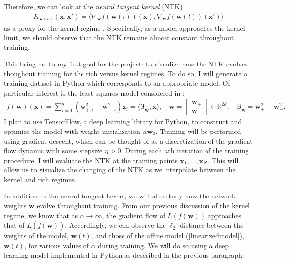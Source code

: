 \documentclass{article}
\begin{document}
Therefore, we can look at the \textit{neural tangent kernel} (NTK)
\begin{align*}
    K_{\boldsymbol{w}(t)}(\boldsymbol{x}, \boldsymbol{x}') = \langle \nabla_{\boldsymbol{w}} f(\boldsymbol{w}(t))(\boldsymbol{x}), \nabla_{\boldsymbol{w}} f(\boldsymbol{w}(t))(\boldsymbol{x}') \rangle
\end{align*}
as a proxy for the kernel regime \cite{jacot2018neural}. Specifically, as a model approaches the kernel limit, we should observe that the NTK remains almost constant throughout training. 

This bring me to my first goal for the project: to visualize how the NTK evolves thoughout training for the rich versus kernel regimes. To do so, I will generate a training dataset in Python which corresponds to an appropriate model. Of particular interest is the least-squares model considered in \cite{woodworth2020kernel}:
\begin{align*}
    f(\boldsymbol{w})(\boldsymbol{x}) = \sum_{i=1}^d (\boldsymbol{w}_{+, i}^2 - \boldsymbol{w}_{-, i}^2)\boldsymbol{x}_i = \langle \boldsymbol{\beta}_{\boldsymbol{w}}, \boldsymbol{x} \rangle, \quad \boldsymbol{w} = \begin{bmatrix}
                        \boldsymbol{w}_+ \\
                        \boldsymbol{w}_-
                        \end{bmatrix} \in \mathbb{R}^{2d},
    \quad \boldsymbol{\beta}_{\boldsymbol{w}} = \boldsymbol{w}_+^2 - \boldsymbol{w}_-^2.
\end{align*}
I plan to use TensorFlow, a deep learning library for Python, to construct and optimize the model with weight initialization $\alpha \boldsymbol{w}_0$. Training will be performed using gradient descent, which can be thought of as a discretization of the gradient flow dynamic with some stepsize $\eta > 0$. During each $n$th iteration of the training procedure, I will evaluate the NTK at the training points $\boldsymbol{x}_1, \ldots, \boldsymbol{x}_N$. This will allow us to visualize the changing of the NTK as we interpolate between the kernel and rich regimes.

In addition to the neural tangent kernel, we will also study how the network weights $\boldsymbol{w}$ evolve throughout training. From our previous discussion of the kernel regime, we know that as $\alpha \rightarrow \infty$, the gradient flow of $L(f(\boldsymbol{w}))$ approaches that of $L(\overline{f}(\boldsymbol{w}))$. Accordingly, we can observe the $\ell_2$ distance between the weights of the model, $\boldsymbol{w}(t)$, and those of the affine model (\ref{linearizedmodel}), $\overline{\boldsymbol{w}}(t)$, for various values of $\alpha$ during training. We will do so using a deep learning model implemented in Python as described in the previous paragraph.
\end{document}
